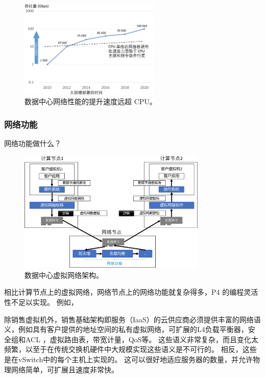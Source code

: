 \begin{figure}[htbp]
	\centering
	\includegraphics[width=0.6\textwidth]{figures/network_perf_trend.pdf}
	\caption{数据中心网络性能的提升速度远超 CPU。}
	\label{background:fig:network-perf-trend}
\end{figure}


\subsubsection{网络功能}

网络功能做什么？

\begin{figure}[htbp]
	\centering
	\includegraphics[width=0.8\textwidth]{figures/VPC_arch.pdf}
	\caption{数据中心虚拟网络架构。}
	\label{background:fig:network-architecture}
\end{figure}

相比计算节点上的虚拟网络，网络节点上的网络功能就复杂得多，P4 的编程灵活性不足以实现。
例如，



除销售虚拟机外，销售基础架构即服务（IaaS）的云供应商必须提供丰富的网络语义，例如具有客户提供的地址空间的私有虚拟网络，可扩展的L4负载平衡器，安全组和ACL ，虚拟路由表，带宽计量，QoS等。 这些语义非常复杂，而且变化太频繁，以至于在传统交换机硬件中大规模实现这些语义是不可行的。 相反，这些是在vSwitch中的每个主机上实现的。 这可以很好地适应服务器的数量，并允许物理网络简单，可扩展且速度非常快。



